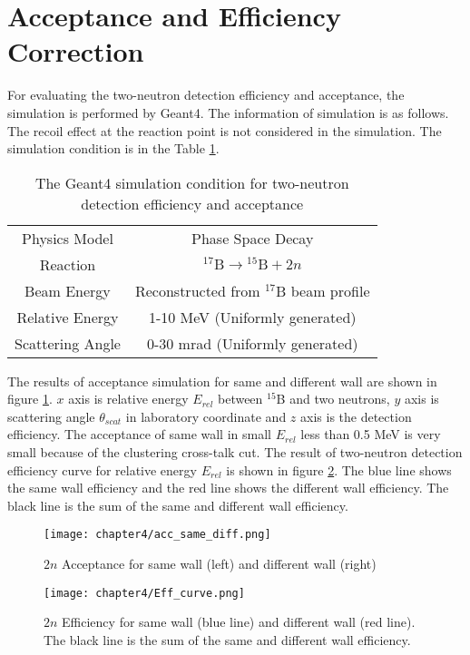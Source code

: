 \section{Acceptance and Efficiency Correction}
For evaluating the two-neutron detection efficiency and acceptance, the simulation is performed by Geant4. The information of simulation is as follows. The recoil effect at the reaction point is not considered in the simulation. The simulation condition is in the Table \ref{tab:2n_sim}.
\begin{table}[h]
    \centering
    \begin{tabular}[h]{c|c}
        \hline
        Physics Model & Phase Space Decay \\
        Reaction & ${}^{17}\text{B} \to {}^{15}\text{B} + 2n$\\
        Beam Energy & Reconstructed from $^{17}$B beam profile\\
        Relative Energy & 1-10 MeV (Uniformly generated)\\
        Scattering Angle & 0-30 mrad (Uniformly generated)\\
        \hline
    \end{tabular}
    \caption{The Geant4 simulation condition for two-neutron detection efficiency and acceptance}
    \label{tab:2n_sim}
\end{table}

The results of acceptance simulation for same and different wall are shown in figure \ref{fig:acc_same_diff}. $x$ axis is relative energy $E_{rel}$ between $^{15}$B and two neutrons, $y$ axis is scattering angle $\theta_{scat}$ in laboratory coordinate and $z$ axis is the detection efficiency. The acceptance of same wall in small $E_{rel}$ less than 0.5 MeV is very small because of the clustering cross-talk cut. The result of two-neutron detection efficiency curve for relative energy $E_{rel}$ is shown in figure \ref{fig:eff}. The blue line shows the same wall efficiency and the red line shows the different wall efficiency. The black line is the sum of the same and different wall efficiency. 
\begin{figure}[h]
    \centering
    \texttt{[image: chapter4/acc\_same\_diff.png]}
    \caption[$2n$ Acceptance for $E_{rel}$ and $\theta_{scat}$]{$2n$ Acceptance for same wall (left) and different wall (right)}
    \label{fig:acc_same_diff}
\end{figure}

\begin{figure}
    \centering
    \texttt{[image: chapter4/Eff\_curve.png]}
    \caption[$2n$ detection efficiency for same wall, diff wall]{$2n$ Efficiency for same wall (blue line) and different wall (red line). The black line is the sum of the same and different wall efficiency.}
    \label{fig:eff}
\end{figure}

